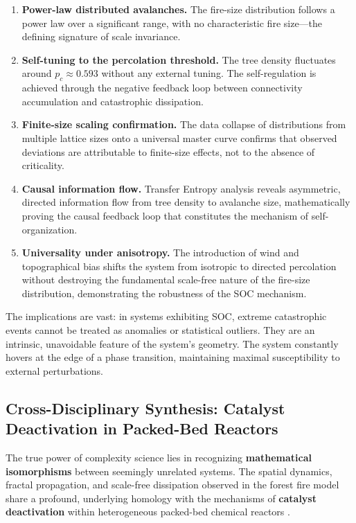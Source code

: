 \documentclass[12pt, a4paper]{article}
\begin{document}
\begin{enumerate}
    \item \textbf{Power-law distributed avalanches.} The fire-size distribution follows a power law over a significant range, with no characteristic fire size---the defining signature of scale invariance.
    
    \item \textbf{Self-tuning to the percolation threshold.} The tree density fluctuates around $p_c \approx 0.593$ without any external tuning. The self-regulation is achieved through the negative feedback loop between connectivity accumulation and catastrophic dissipation.
    
    \item \textbf{Finite-size scaling confirmation.} The data collapse of distributions from multiple lattice sizes onto a universal master curve confirms that observed deviations are attributable to finite-size effects, not to the absence of criticality.
    
    \item \textbf{Causal information flow.} Transfer Entropy analysis reveals asymmetric, directed information flow from tree density to avalanche size, mathematically proving the causal feedback loop that constitutes the mechanism of self-organization.
    
    \item \textbf{Universality under anisotropy.} The introduction of wind and topographical bias shifts the system from isotropic to directed percolation without destroying the fundamental scale-free nature of the fire-size distribution, demonstrating the robustness of the SOC mechanism.
\end{enumerate}

The implications are vast: in systems exhibiting SOC, extreme catastrophic events cannot be treated as anomalies or statistical outliers. They are an intrinsic, unavoidable feature of the system's geometry. The system constantly hovers at the edge of a phase transition, maintaining maximal susceptibility to external perturbations.

\subsection{Cross-Disciplinary Synthesis: Catalyst Deactivation in Packed-Bed Reactors}

The true power of complexity science lies in recognizing \textbf{mathematical isomorphisms} between seemingly unrelated systems. The spatial dynamics, fractal propagation, and scale-free dissipation observed in the forest fire model share a profound, underlying homology with the mechanisms of \textbf{catalyst deactivation} within heterogeneous packed-bed chemical reactors \citep{fogler2020}.
\end{document}
